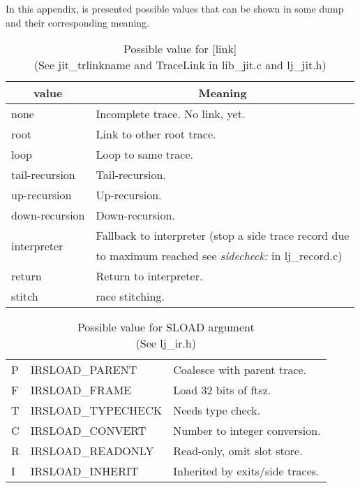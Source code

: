 
In this appendix, is presented possible values that can be shown in some dump
and their corresponding meaning.
\begin{table}
\centering
\begin{tabular}{|l|l|}
\hline
\multicolumn{1}{|c|}{value} & \multicolumn{1}{c|}{Meaning}\\\hline
none                        & Incomplete trace. No link, yet.\\
root                        & Link to other root trace.\\
loop                        & Loop to same trace.\\
tail-recursion              & Tail-recursion.\\
up-recursion                & Up-recursion.\\
down-recursion              & Down-recursion.\\\hline
\multirow{2}{*}{interpreter}& Fallback to interpreter (stop a side trace record due\\
& to maximum reached see \emph{sidecheck:} in lj\_record.c)\\\hline
return                      & Return to interpreter.\\
stitch                      & race stitching.\\\hline
\end{tabular}
\caption{
  Possible value for [link] \\(See jit\_trlinkname and TraceLink in lib\_jit.c
  and lj\_jit.h)
}
\label{tab:dump-link}
\end{table}
\begin{table}
\centering
\begin{tabular}{|l|l|l|}
\hline
P & IRSLOAD\_PARENT    & Coalesce with parent trace.\\
F & IRSLOAD\_FRAME     & Load 32 bits of ftsz.\\
T & IRSLOAD\_TYPECHECK & Needs type check.\\
C & IRSLOAD\_CONVERT   & Number to integer conversion.\\
R & IRSLOAD\_READONLY  & Read-only, omit slot store.\\
I & IRSLOAD\_INHERIT   & Inherited by exits/side traces.\\
\hline
\end{tabular}
\caption{
  Possible value for SLOAD argument \\(See lj\_ir.h)
}
\label{tab:dump-sload}
\end{table}
